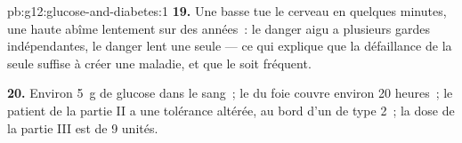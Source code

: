 \begin{solution}{pb:g12:glucose-and-diabetes:1}
\textbf{19.} Une  basse tue le cerveau en quelques minutes,
une  haute abîme lentement sur des années~: le danger aigu a
plusieurs gardes indépendantes, le danger lent une
seule --- ce qui explique que la défaillance de la seule 
suffise à créer une maladie, et que le  soit fréquent.

\textbf{20.} Environ \qty{5}{g} de glucose dans le sang~; le 
du foie couvre environ 20 heures~; le patient de la partie II a une
tolérance altérée, au bord d'un  de type 2~; la dose de la
partie III est de 9 unités.
\end{solution}
